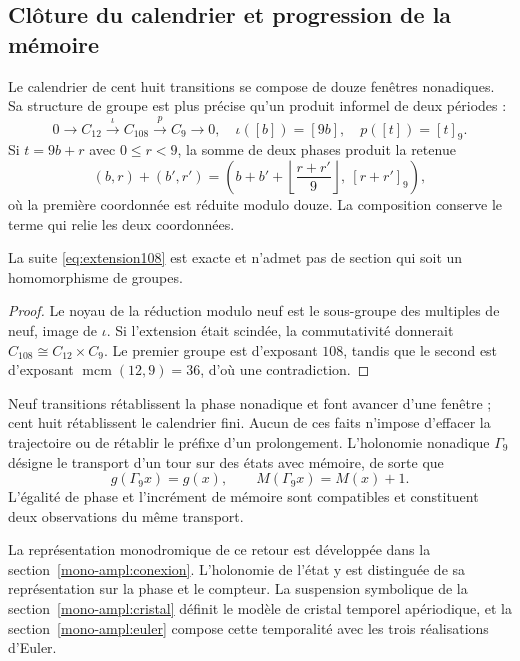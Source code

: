\subsection{Clôture du calendrier et progression de la mémoire}

Le calendrier de cent huit transitions se compose de douze fenêtres nonadiques. Sa structure de groupe est plus précise qu’un produit informel de deux périodes :
\begin{equation}
 0\longrightarrow C_{12}\xrightarrow{\iota}C_{108}
 \xrightarrow{p}C_9\longrightarrow0,
 \quad\iota([b])=[9b],\quad p([t])=[t]_9.
 \label{eq:extension108}
\end{equation}
Si \(t=9b+r\) avec \(0\le r<9\), la somme de deux phases produit la retenue
\[
 (b,r)+(b',r')=
 \left(b+b'+\left\lfloor\frac{r+r'}9\right\rfloor,\ [r+r']_9\right),
\]
où la première coordonnée est réduite modulo douze. La composition conserve le terme qui relie les deux coordonnées.

\begin{proposition}
La suite \eqref{eq:extension108} est exacte et n’admet pas de section qui soit un homomorphisme de groupes.
\end{proposition}
\begin{proof}
Le noyau de la réduction modulo neuf est le sous-groupe des multiples de neuf, image de \(\iota\). Si l’extension était scindée, la commutativité donnerait \(C_{108}\cong C_{12}\times C_9\). Le premier groupe est d’exposant \(108\), tandis que le second est d’exposant \(\operatorname{mcm}(12,9)=36\), d’où une contradiction.
\end{proof}

Neuf transitions rétablissent la phase nonadique et font avancer d’une fenêtre ; cent huit rétablissent le calendrier fini. Aucun de ces faits n’impose d’effacer la trajectoire ou de rétablir le préfixe d’un prolongement. L’holonomie nonadique \(\Gamma_9\) désigne le transport d’un tour sur des états avec mémoire, de sorte que
\begin{equation}
 g(\Gamma_9x)=g(x),\qquad M(\Gamma_9x)=M(x)+1.
 \label{eq:holonomia-memoria}
\end{equation}
L’égalité de phase et l’incrément de mémoire sont compatibles et constituent deux observations du même transport.



La représentation monodromique de ce retour est développée dans la
section~\ref{mono-ampl:conexion}. L’holonomie de
l’état y est distinguée de sa représentation sur la phase et le compteur. La suspension
symbolique de la section~\ref{mono-ampl:cristal} définit le modèle de
cristal temporel apériodique, et la section~\ref{mono-ampl:euler}
compose cette temporalité avec les trois réalisations d’Euler.

